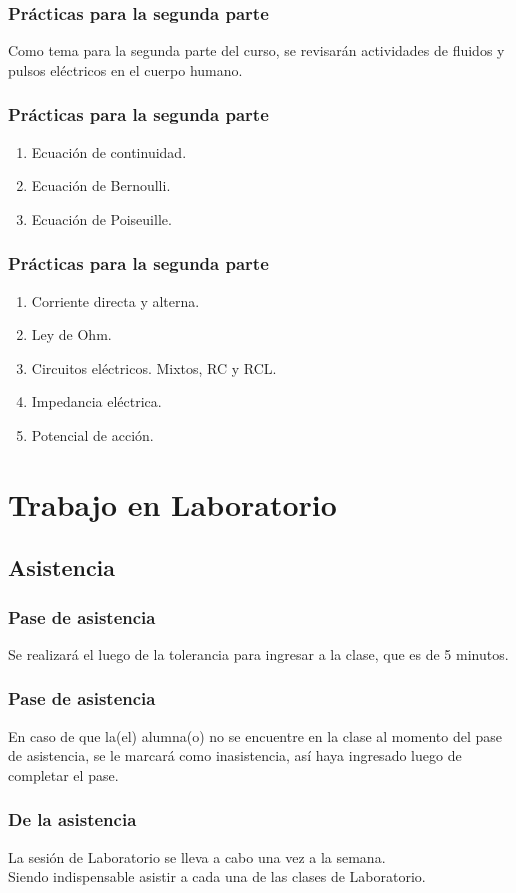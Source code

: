 \documentclass[14pt]{beamer}
\begin{document}
\begin{frame}
\frametitle{Prácticas para la segunda parte}
Como tema para la segunda parte del curso, se revisarán actividades de fluidos y pulsos eléctricos en el cuerpo humano.
\end{frame}
\begin{frame}
\frametitle{Prácticas para la segunda parte}
\begin{enumerate}[<+->]
\item Ecuación de continuidad.
\item Ecuación de Bernoulli.
\item Ecuación de Poiseuille.
\seti
\end{enumerate}
\end{frame}
\begin{frame}
\frametitle{Prácticas para la segunda parte}
\begin{enumerate}[<+->]
\conti
\item Corriente directa y alterna.
\item Ley de Ohm.
\item Circuitos eléctricos. Mixtos, RC y RCL.
\item Impedancia eléctrica.
\item Potencial de acción.
\end{enumerate}
\end{frame}

\section{Trabajo en Laboratorio}

\subsection{Asistencia}

\begin{frame}
\frametitle{Pase de asistencia}
Se realizará el  luego de la tolerancia para ingresar a la clase, que es de 5 minutos.
\end{frame}
\begin{frame}
\frametitle{Pase de asistencia}
En caso de que la(el) alumna(o) no se encuentre en la clase al momento del pase de asistencia, se le marcará como inasistencia, así haya ingresado luego de completar el pase.
\end{frame}
\begin{frame}
\frametitle{De la asistencia}
La sesión de Laboratorio se lleva a cabo una vez a la semana.
\\
\bigskip
\pause
Siendo indispensable asistir a cada una de las clases de Laboratorio.
\end{frame}
    
\end{document}
